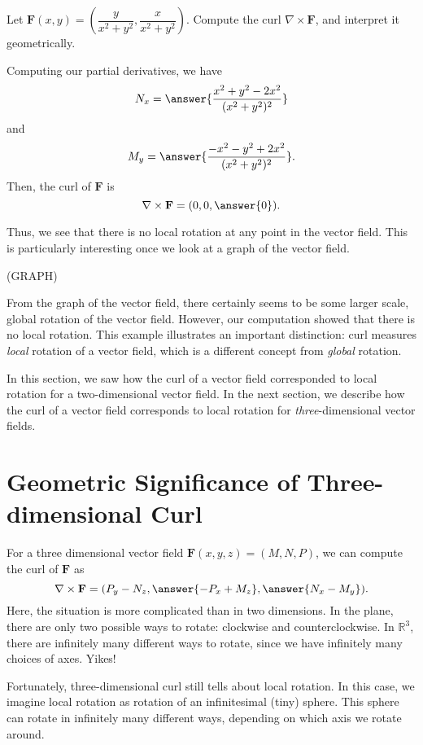 \documentclass{ximera}
\begin{document}
\begin{example}
Let $\mathbf{F}(x,y)=\left(\dfrac{y}{x^2+y^2},\dfrac{x}{x^2+y^2}\right)$. Compute the curl $\nabla\times\mathbf{F}$, and interpret it geometrically.
\begin{explanation}
Computing our partial derivatives, we have
\[
N_x = \answer{\frac{x^2+y^2-2x^2}{(x^2+y^2)^2}}
\]
and 
\[
M_y = \answer{\frac{-x^2-y^2+2x^2}{(x^2+y^2)^2}}.
\]
Then, the curl of $\mathbf{F}$ is
\[
\nabla\times\mathbf{F} = (0,0,\answer{0}).
\]

Thus, we see that there is no local rotation at any point in the vector field. This is particularly interesting once we look at a graph of the vector field.

(GRAPH)

From the graph of the vector field, there certainly seems to be some larger scale, global rotation of the vector field. However, our computation showed that there is no local rotation. This example illustrates an important distinction: curl measures \emph{local} rotation of a vector field, which is a different concept from \emph{global} rotation.
\end{explanation}
\end{example}

In this section, we saw how the curl of a vector field corresponded to local rotation for a two-dimensional vector field. In the next section, we describe how the curl of a vector field corresponds to local rotation for \emph{three}-dimensional vector fields.

\section*{Geometric Significance of Three-dimensional Curl}

For a three dimensional vector field $\mathbf{F}(x,y,z)=(M,N,P)$, we can compute the curl of $\mathbf{F}$ as
\[
\nabla\times \mathbf{F} = (P_y-N_z, \answer{-P_x+M_z},\answer{N_x-M_y}).
\]
Here, the situation is more complicated than in two dimensions. In the plane, there are only two possible ways to rotate: clockwise and counterclockwise. In $\mathbb{R}^3$, there are infinitely many different ways to rotate, since we have infinitely many choices of axes. Yikes!

Fortunately, three-dimensional curl still tells about local rotation. In this case, we imagine local rotation as rotation of an infinitesimal (tiny) sphere. This sphere can rotate in infinitely many different ways, depending on which axis we rotate around.
\end{document}
